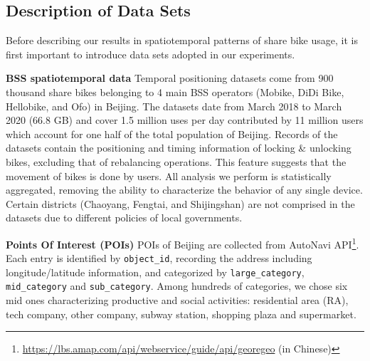 \documentclass[ijgi,submit,moreauthors,pdftex]{Definitions/mdpi}
\begin{document}
\subsection{Description of Data Sets}
Before describing our results in spatiotemporal patterns of share bike usage, it is first important to introduce data sets adopted in our experiments.

\textbf{BSS spatiotemporal data} Temporal positioning datasets come from 900 thousand share bikes belonging to 4 main BSS operators (Mobike, DiDi Bike, Hellobike, and Ofo) in Beijing.
The datasets date from March 2018 to March 2020 (66.8 GB) and cover 1.5 million uses per day contributed by 11 million users which account for one half of the total population of Beijing.
Records of the datasets contain the positioning and timing information of locking \& unlocking bikes, excluding that of rebalancing operations.
This feature suggests that the movement of bikes is done by users.
All analysis we perform is statistically aggregated, removing the ability to characterize the behavior of any single device.
Certain districts (Chaoyang, Fengtai, and Shijingshan) are not comprised in the datasets due to different policies of local governments.

\textbf{Points Of Interest (POIs)} POIs of Beijing are collected from AutoNavi API\footnote{\url{https://lbs.amap.com/api/webservice/guide/api/georegeo} (in Chinese)}.
Each entry is identified by \texttt{object\_id}, recording the address including longitude/latitude information, and categorized by \texttt{large\_category}, \texttt{mid\_category} and \texttt{sub\_category}.
Among hundreds of categories, we chose six mid ones characterizing productive and social activities: residential area (RA), tech company, other company, subway station, shopping plaza and supermarket.
\end{document}
